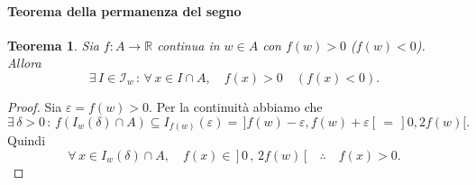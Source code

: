 \documentclass{article}
\theoremstyle{plain}
\newtheorem{thm}{Teorema}[section]
\theoremstyle{definition}
\theoremstyle{remark}
\begin{document}
\paragraph{Teorema della permanenza del segno}
\begin{bxthm}
\begin{thm}
    Sia $f:A\to\mathbb{R}$ continua in $w\in A$ con $f(w)>0$ ($f(w)<0$). Allora 
    \[\exists\, I\in \mathcal{I}_{w}\,:\,\forall\, x\in I\cap A,\quad f(x)>0\quad(f(x)<0).\]
\end{thm}
\end{bxthm}
\begin{proof}
    Sia $\varepsilon=f(w)>0$. Per la continuità abbiamo che 
    \[ \exists\, \delta>0 \,:\, f(I_w(\delta)\cap A)\subseteq I_{f(w)}(\varepsilon)=\,]f(w)-\varepsilon,f(w)+\varepsilon[\,=\,]0,2f(w)[. \]
    Quindi 
    \[\forall\, x\in I_w(\delta)\cap A,\quad f(x)\in \,]\,0\,,\,2f(w)\,[\quad\therefore\quad f(x)>0.\]
\end{proof}

\vspace{10pt}
\end{document}
